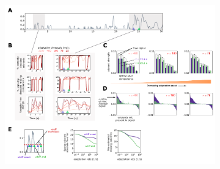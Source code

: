 


\begin{figure}
	\begin{subfigure}[t]{\linewidth}
		{\includegraphics[width=\linewidth]{figures/Figures_temporal_coding}}
		\label{fig:temporal_coding_a}
	\end{subfigure}
	\begin{subfigure}[t]{0\linewidth}
		\label{fig:temporal_coding_b}
	\end{subfigure}
	\begin{subfigure}[t]{0\linewidth}
		\label{fig:temporal_coding_c}
	\end{subfigure}
	\begin{subfigure}[t]{0\linewidth}
		\label{fig:temporal_coding_d}
	\end{subfigure}
	\begin{subfigure}[t]{0\linewidth}
		\label{fig:temporal_coding_e}
	\end{subfigure}

\end{figure}
